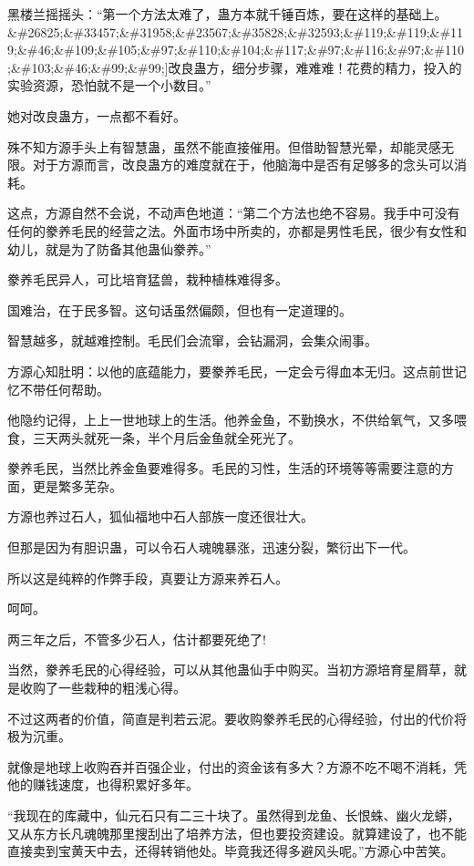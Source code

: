\begin{this_body}
黑楼兰摇摇头：“第一个方法太难了，蛊方本就千锤百炼，要在这样的基础上。\&\#26825;\&\#33457;\&\#31958;\&\#23567;\&\#35828;\&\#32593;\&\#119;\&\#119;\&\#119;\&\#46;\&\#109;\&\#105;\&\#97;\&\#110;\&\#104;\&\#117;\&\#97;\&\#116;\&\#97;\&\#110;\&\#103;\&\#46;\&\#99;\&\#99;]改良蛊方，细分步骤，难难难！花费的精力，投入的实验资源，恐怕就不是一个小数目。”

她对改良蛊方，一点都不看好。

殊不知方源手头上有智慧蛊，虽然不能直接催用。但借助智慧光晕，却能灵感无限。对于方源而言，改良蛊方的难度就在于，他脑海中是否有足够多的念头可以消耗。

这点，方源自然不会说，不动声色地道：“第二个方法也绝不容易。我手中可没有任何的豢养毛民的经营之法。外面市场中所卖的，亦都是男性毛民，很少有女性和幼儿，就是为了防备其他蛊仙豢养。”

豢养毛民异人，可比培育猛兽，栽种植株难得多。

国难治，在于民多智。这句话虽然偏颇，但也有一定道理的。

智慧越多，就越难控制。毛民们会流窜，会钻漏洞，会集众闹事。

方源心知肚明：以他的底蕴能力，要豢养毛民，一定会亏得血本无归。这点前世记忆不带任何帮助。

他隐约记得，上上一世地球上的生活。他养金鱼，不勤换水，不供给氧气，又多喂食，三天两头就死一条，半个月后金鱼就全死光了。

豢养毛民，当然比养金鱼要难得多。毛民的习性，生活的环境等等需要注意的方面，更是繁多芜杂。

方源也养过石人，狐仙福地中石人部族一度还很壮大。

但那是因为有胆识蛊，可以令石人魂魄暴涨，迅速分裂，繁衍出下一代。

所以这是纯粹的作弊手段，真要让方源来养石人。

呵呵。

两三年之后，不管多少石人，估计都要死绝了!

当然，豢养毛民的心得经验，可以从其他蛊仙手中购买。当初方源培育星屑草，就是收购了一些栽种的粗浅心得。

不过这两者的价值，简直是判若云泥。要收购豢养毛民的心得经验，付出的代价将极为沉重。

就像是地球上收购吞并百强企业，付出的资金该有多大？方源不吃不喝不消耗，凭他的赚钱速度，也得积累好多年。

“我现在的库藏中，仙元石只有二三十块了。虽然得到龙鱼、长恨蛛、幽火龙蟒，又从东方长凡魂魄那里搜刮出了培养方法，但也要投资建设。就算建设了，也不能直接卖到宝黄天中去，还得转销他处。毕竟我还得多避风头呢。”方源心中苦笑。


\end{this_body}
